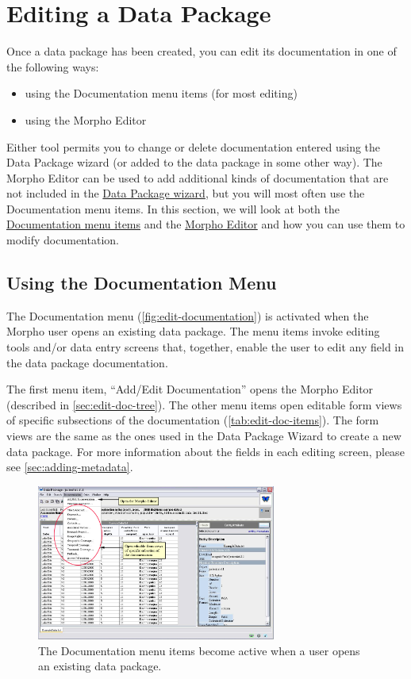 \section{Editing a Data Package} \label{sec:editing}

Once a data package has been created, you can edit its documentation in
one of the following ways: 

\begin{itemize}
  \setlength{\parskip}{1pt}
  \item using the Documentation menu items (for most editing)
  \item using the Morpho Editor 
\end{itemize}

Either tool permits you to change or delete documentation entered using
the Data Package wizard (or added to the data package in some other
way). The Morpho Editor can be used to add additional kinds of
documentation that are not included in the
\hyperref[sec:wizard-newdp]{Data Package wizard}, but you will most
often use the Documentation menu items. In this section, we will look at
both the \hyperref[sec:edit-doc-panels]{Documentation menu items} and
the \hyperref[sec:edit-doc-tree]{Morpho Editor} and how you can use them
to modify documentation. 

\subsection{Using the Documentation Menu} \label{sec:edit-doc-panels}

The Documentation menu (\autoref{fig:edit-documentation}) is activated
when the Morpho user opens an existing data package. The menu items
invoke editing tools and/or data entry screens that, together, enable
the user to edit any field in the data package documentation. 

The first menu item, ``Add/Edit Documentation'' opens the Morpho Editor
(described in \autoref{sec:edit-doc-tree}). The other menu items open
editable form views of specific subsections of the documentation
(\autoref{tab:edit-doc-items}). The form views are the same as the ones
used in the Data Package Wizard to create a new data package. For more
information about the fields in each editing screen, please see
\autoref{sec:adding-metadata}.

\begin{figure}
  \centering
    \includegraphics[width=0.7\textwidth]{images/edit-documentation.jpg}
  \caption{The Documentation menu items become active when a user opens
    an existing data package.}
  \label{fig:edit-documentation}
\end{figure}

